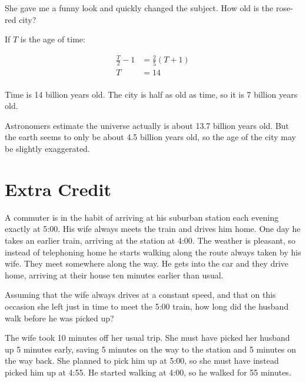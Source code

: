\documentclass[letterpaper]{exam}
\begin{document}
\begin{questions}
      She gave me a funny look and quickly changed the subject.  How old is the rose-red city?

      \begin{solution}
        If $T$ is the age of time:

        \begin{align*}
          \frac{T}{2} - 1 & = \frac{2}{5} (T + 1) \\
          T               & = 14 \\
        \end{align*}

        Time is 14 billion years old.  The city is half as old as time, so it is 7 billion years old.

        Astronomers estimate the universe actually is about 13.7 billion years old.  But the earth seems to only be
        about 4.5 billion years old, so the age of the city may be slightly exaggerated.

      \end{solution}
  \end{questions}

  \section{Extra Credit}

  A commuter is in the habit of arriving at his suburban station each evening exactly at 5:00.  His wife always meets
  the train and drives him home.  One day he takes an earlier train, arriving at the station at 4:00.  The weather is
  pleasant, so instead of telephoning home he starts walking along the route always taken by his wife.  They meet
  somewhere along the way.  He gets into the car and they drive home, arriving at their house ten minutes earlier than
  usual.  

  Assuming that the wife always drives at a constant speed, and that on this occasion she left just in time to meet
  the 5:00 train, how long did the husband walk before he was picked up?

  \begin{solution}
    The wife took 10 minutes off her usual trip.  She must have picked her husband up 5 minutes early, saving 5
    minutes on the way to the station and 5 minutes on the way back.  She planned to pick him up at 5:00, so she must
    have instead picked him up at 4:55.  He started walking at 4:00, so he walked for 55 minutes.
  \end{solution}
\end{document}
